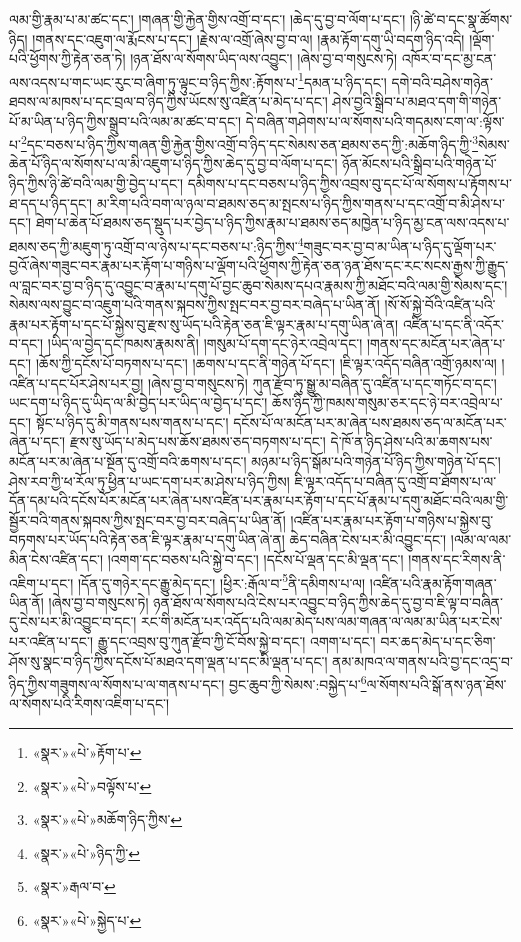 ལམ་གྱི་རྣམ་པ་མ་ཚང་དང་། །གཞན་གྱི་རྐྱེན་གྱིས་འགྲོ་བ་དང་། །ཆེད་དུ་བྱ་བ་ལོག་པ་དང་། །ཉི་ཚེ་བ་དང་སྣ་ཚོགས་ཉིད། །གནས་དང་འཇུག་ལ་རྨོངས་པ་དང་། །རྗེས་ལ་འགྲོ་ཞེས་བྱ་བ་ལ། །རྣམ་རྟོག་དགུ་ཡི་བདག་ཉིད་འདི། །ལྡོག་པའི་ཕྱོགས་ཀྱི་རྟེན་ཅན་ཏེ། །ཉན་ཐོས་ལ་སོགས་ཡིད་ལས་འབྱུང་། །ཞེས་བྱ་བ་གསུངས་ཏེ། འཁོར་བ་དང་མྱ་ངན་ལས་འདས་པ་གང་ཡང་རུང་བ་ཞིག་ཏུ་ལྟུང་བ་ཉིད་ཀྱིས་:རྟོགས་པ་\footnote{«སྣར་»«པེ་»རྟོག་པ་}དམན་པ་ཉིད་དང་། དགེ་བའི་བཤེས་གཉེན་ཐབས་ལ་མཁས་པ་དང་བྲལ་བ་ཉིད་ཀྱིས་ཡོངས་སུ་འཛིན་པ་མེད་པ་དང་། ཤེས་བྱའི་སྒྲིབ་པ་མཐའ་དག་གི་གཉེན་པོ་མ་ཡིན་པ་ཉིད་ཀྱིས་སྒྲུབ་པའི་ལམ་མ་ཚང་བ་དང་། དེ་བཞིན་གཤེགས་པ་ལ་སོགས་པའི་གདམས་ངག་ལ་:ལྟོས་པ་\footnote{«སྣར་»«པེ་»བལྟོས་པ་}དང་བཅས་པ་ཉིད་ཀྱིས་གཞན་གྱི་རྐྱེན་གྱིས་འགྲོ་བ་ཉིད་དང་སེམས་ཅན་ཐམས་ཅད་ཀྱི་:མཆོག་ཉིད་ཀྱི་\footnote{«སྣར་»«པེ་»མཆོག་ཉིད་ཀྱིས་}སེམས་ཆེན་པོ་ཉིད་ལ་སོགས་པ་ལ་མི་འཇུག་པ་ཉིད་ཀྱིས་ཆེད་དུ་བྱ་བ་ལོག་པ་དང་། ཉོན་མོངས་པའི་སྒྲིབ་པའི་གཉེན་པོ་ཉིད་ཀྱིས་ཉི་ཚེ་བའི་ལམ་གྱི་བྱེད་པ་དང་། དམིགས་པ་དང་བཅས་པ་ཉིད་ཀྱིས་འབྲས་བུ་དང་པོ་ལ་སོགས་པ་རྟོགས་པ་ཐ་དད་པ་ཉིད་དང་། མ་རིག་པའི་བག་ལ་ཉལ་བ་ཐམས་ཅད་མ་སྤངས་པ་ཉིད་ཀྱིས་གནས་པ་དང་འགྲོ་བ་མི་ཤེས་པ་དང་། ཐེག་པ་ཆེན་པོ་ཐམས་ཅད་སྡུད་པར་བྱེད་པ་ཉིད་ཀྱིས་རྣམ་པ་ཐམས་ཅད་མཁྱེན་པ་ཉིད་མྱ་ངན་ལས་འདས་པ་ཐམས་ཅད་ཀྱི་མཇུག་ཏུ་འགྲོ་བ་ལ་ཉེས་པ་དང་བཅས་པ་:ཉིད་ཀྱིས་\footnote{«སྣར་»«པེ་»ཉིད་ཀྱི་}གཟུང་བར་བྱ་བ་མ་ཡིན་པ་ཉིད་དུ་ལྡོག་པར་བྱའོ་ཞེས་གཟུང་བར་རྣམ་པར་རྟོག་པ་གཉིས་པ་ལྡོག་པའི་ཕྱོགས་ཀྱི་རྟེན་ཅན་ཉན་ཐོས་དང་རང་སངས་རྒྱས་ཀྱི་རྒྱུད་ལ་བླང་བར་བྱ་བ་ཉིད་དུ་འབྱུང་བ་རྣམ་པ་དགུ་པོ་བྱང་ཆུབ་སེམས་དཔའ་རྣམས་ཀྱི་མཐོང་བའི་ལམ་གྱི་སེམས་དང་། སེམས་ལས་བྱུང་བ་འཇུག་པའི་གནས་སྐབས་ཀྱིས་སྤང་བར་བྱ་བར་བཞེད་པ་ཡིན་ནོ། །སོ་སོ་སྐྱེ་བོའི་འཛིན་པའི་རྣམ་པར་རྟོག་པ་དང་པོ་སྐྱེས་བུ་རྫས་སུ་ཡོད་པའི་རྟེན་ཅན་ཇི་ལྟར་རྣམ་པ་དགུ་ཡིན་ཞེ་ན། འཛིན་པ་དང་ནི་འདོར་བ་དང་། །ཡིད་ལ་བྱེད་དང་ཁམས་རྣམས་ནི། །གསུམ་པོ་དག་དང་ཉེར་འབྲེལ་དང་། །གནས་དང་མངོན་པར་ཞེན་པ་དང་། །ཆོས་ཀྱི་དངོས་པོ་བཏགས་པ་དང་། །ཆགས་པ་དང་ནི་གཉེན་པོ་དང་། །ཇི་ལྟར་འདོད་བཞིན་འགྲོ་ཉམས་ལ། །འཛིན་པ་དང་པོར་ཤེས་པར་བྱ། །ཞེས་བྱ་བ་གསུངས་ཏེ། ཀུན་རྫོབ་ཏུ་སྒྱུ་མ་བཞིན་དུ་འཛིན་པ་དང་གཏོང་བ་དང་། ཡང་དག་པ་ཉིད་དུ་ཡིད་ལ་མི་བྱེད་པར་ཡིད་ལ་བྱེད་པ་དང་། ཆོས་ཉིད་ཀྱི་ཁམས་གསུམ་ཅར་དང་ཉེ་བར་འབྲེལ་པ་དང་། སྟོང་པ་ཉིད་དུ་མི་གནས་པས་གནས་པ་དང་། དངོས་པོ་ལ་མངོན་པར་མ་ཞེན་པས་ཐམས་ཅད་ལ་མངོན་པར་ཞེན་པ་དང་། རྫས་སུ་ཡོད་པ་མེད་པས་ཆོས་ཐམས་ཅད་བཏགས་པ་དང་། དེ་ཁོ་ན་ཉིད་ཤེས་པའི་མ་ཆགས་པས་མངོན་པར་མ་ཞེན་པ་སྔོན་དུ་འགྲོ་བའི་ཆགས་པ་དང་། མཉམ་པ་ཉིད་སྒོམ་པའི་གཉེན་པོ་ཉིད་ཀྱིས་གཉེན་པོ་དང་། ཤེས་རབ་ཀྱི་ཕ་རོལ་ཏུ་ཕྱིན་པ་ཡང་དག་པར་མ་ཤེས་པ་ཉིད་ཀྱིས། ཇི་ལྟར་འདོད་པ་བཞིན་དུ་འགྲོ་བ་ཐོགས་པ་ལ་དོན་དམ་པའི་དངོས་པོར་མངོན་པར་ཞེན་པས་འཛིན་པར་རྣམ་པར་རྟོག་པ་དང་པོ་རྣམ་པ་དགུ་མཐོང་བའི་ལམ་གྱི་སྦྱོར་བའི་གནས་སྐབས་ཀྱིས་སྤང་བར་བྱ་བར་བཞེད་པ་ཡིན་ནོ། །འཛིན་པར་རྣམ་པར་རྟོག་པ་གཉིས་པ་སྐྱེས་བུ་བཏགས་པར་ཡོད་པའི་རྟེན་ཅན་ཇི་ལྟར་རྣམ་པ་དགུ་ཡིན་ཞེ་ན། ཆེད་བཞིན་ངེས་པར་མི་འབྱུང་དང་། །ལམ་ལ་ལམ་མིན་ངེས་འཛིན་དང་། །འགག་དང་བཅས་པའི་སྐྱེ་བ་དང་། །དངོས་པོ་ལྡན་དང་མི་ལྡན་དང་། །གནས་དང་རིགས་ནི་འཇིག་པ་དང་། །དོན་དུ་གཉེར་དང་རྒྱུ་མེད་དང་། །ཕྱིར་:རྒོལ་བ་\footnote{«སྣར་»རྒལ་བ་}ནི་དམིགས་པ་ལ། །འཛིན་པའི་རྣམ་རྟོག་གཞན་ཡིན་ནོ། །ཞེས་བྱ་བ་གསུངས་ཏེ། ཉན་ཐོས་ལ་སོགས་པའི་ངེས་པར་འབྱུང་བ་ཉིད་ཀྱིས་ཆེད་དུ་བྱ་བ་ཇི་ལྟ་བ་བཞིན་དུ་ངེས་པར་མི་འབྱུང་བ་དང་། རང་གི་མངོན་པར་འདོད་པའི་ལམ་མེད་པས་ལམ་གཞན་ལ་ལམ་མ་ཡིན་པར་ངེས་པར་འཛིན་པ་དང་། རྒྱུ་དང་འབྲས་བུ་ཀུན་རྫོབ་ཀྱི་ངོ་བོས་སྐྱེ་བ་དང་། འགག་པ་དང་། བར་ཆད་མེད་པ་དང་ཅིག་ཤོས་སུ་སྣང་བ་ཉིད་ཀྱིས་དངོས་པོ་མཐའ་དག་ལྡན་པ་དང་མི་ལྡན་པ་དང་། ནམ་མཁའ་ལ་གནས་པའི་བྱ་དང་འདྲ་བ་ཉིད་ཀྱིས་གཟུགས་ལ་སོགས་པ་ལ་གནས་པ་དང་། བྱང་ཆུབ་ཀྱི་སེམས་:བསྐྱེད་པ་\footnote{«སྣར་»«པེ་»སྐྱེད་པ་}ལ་སོགས་པའི་སྒོ་ནས་ཉན་ཐོས་ལ་སོགས་པའི་རིགས་འཇིག་པ་དང་། 